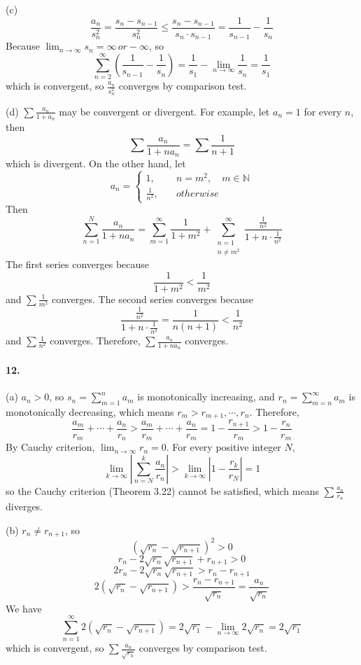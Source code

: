 \documentclass[a4paper]{article}
\begin{document}
(c)
\[
\frac{a_n}{s_n^2}=\frac{s_{n}-s_{n-1}}{s_n^2}\leq\frac{s_n-s_{n-1}}{s_n\cdot s_{n-1}}=\frac{1}{s_{n-1}}-\frac{1}{s_n}
\]
Because $\lim_{n\to\infty}s_n=\infty\,or-\infty$, so
\[
\sum_{n=2}^\infty\left(\frac{1}{s_{n-1}}-\frac{1}{s_n} \right)=\frac{1}{s_1}-\lim_{n\to\infty}\frac{1}{s_n}=\frac{1}{s_1}
\]
which is convergent, so $\frac{a_n}{s_n^2}$ converges by comparison test.
\medskip

(d)
$\sum\frac{a_n}{1+a_n}$ may be convergent or divergent. For example, let $a_n=1$ for every $n$, then
\[
\sum\frac{a_n}{1+na_n}=\sum\frac{1}{n+1}
\]
which is divergent. On the other hand, let
\[
a_n=
\begin{cases}
1,\quad & n=m^2,\quad m\in\mathbb{N}\\
\frac{1}{n^2},\quad & otherwise
\end{cases}
\]
Then
\[
\sum_{n=1}^N\frac{a_n}{1+na_n}=\sum_{m=1}^\infty\frac{1}{1+m^2}+\sum_{\substack{n=1\\n\neq m^2}}^\infty\frac{\frac{1}{n^2}}{1+n\cdot\frac{1}{n^2}}
\]
The first series converges because 
\[
\frac{1}{1+m^2}<\frac{1}{m^2}
\]
and $\sum\frac{1}{m^2}$ converges. The second series converges because 
\[
\frac{\frac{1}{n^2}}{1+n\cdot\frac{1}{n^2}}=\frac{1}{n(n+1)}<\frac{1}{n^2}
\]
and $\sum\frac{1}{n^2}$ converges. Therefore, $\sum\frac{a_n}{1+na_n}$ converges.

\paragraph{12.}
(a)
$a_n>0$, so $s_n=\sum_{m=1}^n a_m$ is monotonically increasing, and $r_n=\sum_{m=n}^\infty a_m$ is monotonically decreasing, which means $r_m>r_{m+1},\cdots,r_{n}$. Therefore,
\[
\frac{a_m}{r_m}+\cdots+\frac{a_n}{r_n}>\frac{a_m}{r_m}+\cdots+\frac{a_n}{r_m}=1-\frac{r_{n+1}}{r_m}>1-\frac{r_n}{r_m}
\]
By Cauchy criterion, $\lim_{n\to\infty}r_n=0$. For every positive integer $N$,
\[
\lim_{k\to\infty}\left|\sum_{n=N}^k\frac{a_n}{r_n} \right|>\lim_{k\to\infty}\left|1-\frac{r_k}{r_N} \right|=1
\]
so the Cauchy criterion (Theorem 3.22) cannot be satisfied, which means $\sum\frac{a_n}{r_n}$ diverges.
\medskip

(b)
$r_n\neq r_{n+1}$, so 
\[
(\sqrt{r_n}-\sqrt{r_{n+1}})^2>0
\]
\[
r_n-2\sqrt{r_n}\sqrt{r_{n+1}}+r_{n+1}>0
\]
\[
2r_n-2\sqrt{r_n}\sqrt{r_{n+1}}>r_n-r_{n+1}
\]
\[
2(\sqrt{r_n}-\sqrt{r_{n+1}})>\frac{r_n-r_{n+1}}{\sqrt{r_n}}=\frac{a_n}{\sqrt{r_n}}
\]
We have
\[
\sum_{n=1}^\infty2(\sqrt{r_n}-\sqrt{r_{n+1}})=2\sqrt{r_1}-\lim_{n\to\infty}2\sqrt{r_{n}}=2\sqrt{r_1}
\]
which is convergent, so $\sum\frac{a_n}{\sqrt{r_n}}$ converges by comparison test.
\end{document}
